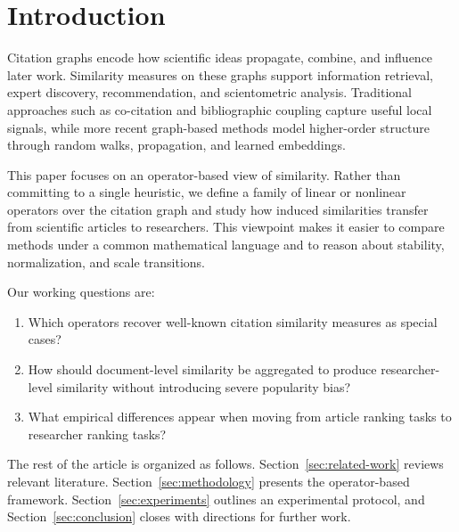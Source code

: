 \section{Introduction}

Citation graphs encode how scientific ideas propagate, combine, and influence later work.
Similarity measures on these graphs support information retrieval, expert discovery,
recommendation, and scientometric analysis. Traditional approaches such as co-citation and
bibliographic coupling capture useful local signals, while more recent graph-based methods
model higher-order structure through random walks, propagation, and learned embeddings.

This paper focuses on an operator-based view of similarity. Rather than committing to a
single heuristic, we define a family of linear or nonlinear operators over the citation
graph and study how induced similarities transfer from scientific articles to researchers.
This viewpoint makes it easier to compare methods under a common mathematical language and
to reason about stability, normalization, and scale transitions.

Our working questions are:
\begin{enumerate}[label=(Q\arabic*)]
    \item Which operators recover well-known citation similarity measures as special cases?
    \item How should document-level similarity be aggregated to produce researcher-level
    similarity without introducing severe popularity bias?
    \item What empirical differences appear when moving from article ranking tasks to
    researcher ranking tasks?
\end{enumerate}

The rest of the article is organized as follows. Section~\ref{sec:related-work} reviews
relevant literature. Section~\ref{sec:methodology} presents the operator-based framework.
Section~\ref{sec:experiments} outlines an experimental protocol, and
Section~\ref{sec:conclusion} closes with directions for further work.

